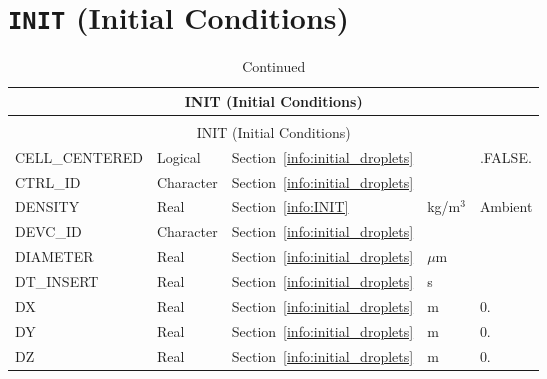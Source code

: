 \documentclass[11pt]{book}
\begin{document}
\vspace{\baselineskip}



\section{\texorpdfstring{{\tt INIT}}{INIT} (Initial Conditions)}


\begin{longtable}{@{\extracolsep{\fill}}|l|l|l|l|l|}
\caption[Initial conditions ({\ct INIT} namelist group)]{For more information see Section~\ref{info:INIT}.}
\label{tbl:INIT} \\
\hline
\multicolumn{5}{|c|}{{\ct INIT} (Initial Conditions)} \\
\hline \hline
\endfirsthead
\caption[]{Continued} \\
\hline
\multicolumn{5}{|c|}{{\ct INIT} (Initial Conditions)} \\
\hline \hline
\endhead
{\ct CELL\_CENTERED}            & Logical           & Section~\ref{info:initial_droplets}           &               & {\ct .FALSE.} \\ \hline
{\ct CTRL\_ID}                  & Character         & Section~\ref{info:initial_droplets}           &               &               \\ \hline
{\ct DENSITY}                   & Real              & Section~\ref{info:INIT}                       & kg/m$^3$      & Ambient       \\ \hline
{\ct DEVC\_ID}                  & Character         & Section~\ref{info:initial_droplets}           &               &               \\ \hline
{\ct DIAMETER}                  & Real              & Section~\ref{info:initial_droplets}           & $\mu$m        &               \\ \hline
{\ct DT\_INSERT}                & Real              & Section~\ref{info:initial_droplets}           & s             &               \\ \hline
{\ct DX}                        & Real              & Section~\ref{info:initial_droplets}           & m             & 0.            \\ \hline
{\ct DY}                        & Real              & Section~\ref{info:initial_droplets}           & m             & 0.            \\ \hline
{\ct DZ}                        & Real              & Section~\ref{info:initial_droplets}           & m             & 0.            \\ \hline

\end{longtable}
\end{document}
